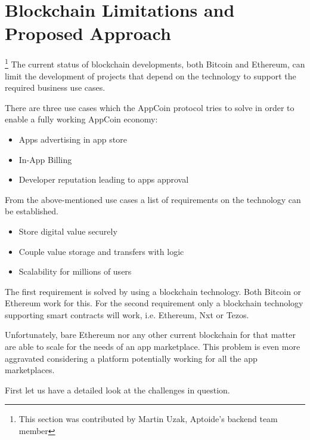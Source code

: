 \section{Blockchain Limitations and Proposed Approach}
\label{sec:limitations}

\footnote{This section was contributed by Martin Uzak, Aptoide's backend team member}
The current status of blockchain developments, both Bitcoin and Ethereum, can limit the development of projects that depend on the technology to support the required business use cases. %
 
There are three use cases which the AppCoin protocol tries to solve in order to enable a fully working AppCoin economy:


\begin{itemize}
    \item Apps advertising in app store
    \item In-App Billing 
    \item Developer reputation leading to apps approval
\end{itemize}

From the above-mentioned use cases a list of requirements on the technology can be established. 

\begin{itemize}
    \item Store digital value securely
    \item Couple value storage and transfers with logic
    \item Scalability for millions of users
\end{itemize}

The first requirement is solved by using a blockchain technology. Both Bitcoin or Ethereum work for this. For the second requirement only a blockchain technology supporting smart contracts will work, i.e. Ethereum, Nxt or Tezos.

Unfortunately, bare Ethereum nor any other current blockchain for that matter are able to scale for the needs of an app marketplace. This problem is even more aggravated considering a platform potentially working for all the app marketplaces.

First let us have a detailed look at the challenges in question.

